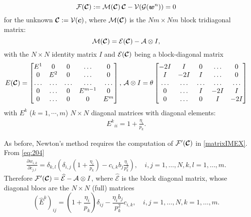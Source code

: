 \documentclass[preprint]{elsarticle}
\theoremstyle{definition}
\newcommand{\bw}{\boldsymbol w}
\newcommand{\bc}{\boldsymbol c}
\newcommand{\clC}{{\boc{C}}}
\def\boc#1{\boldsymbol{{\cal #1}}}
\begin{document}
 \begin{equation}\label{matrixIMEX} 
{\mathcal{F}(\clC):=\mathcal{M}}(\clC) \,  {\clC}-{\mathcal{V}(\mathcal{G}(\bw^{n}))}=0
\end{equation}
for the unknown $\clC:=\mathcal{V}(\bc)$, where    ${\cal
  M}(\clC)$ is the $N m \times N m$ 
block tridiagonal matrix: 
 \begin{equation} 
{\cal M} (\clC)= {\cal E}(\clC) - \mathcal{A}\otimes I,
\end{equation}
with the $N\times N$ identity matrix $I$ and ${\cal E}(\clC)$ being a block-diagonal matrix 
\[E(\clC)= \begin{bmatrix} E^1 & {0}&{0}&{\dots}&{0}\\ 
{0}&{E^2}&{0}&{\dots}&{0} \\ 
{\dots}&{\dots}&{\dots}&{\dots}&{\dots} \\ 
{0}&{\dots}&{0}&{E^{m-1}}&{0} \\ 
{0}&{\dots}&{0}&{0}&{E^m}  \\ 
\end{bmatrix}, \,
\mathcal{A}\otimes I=\theta\begin{bmatrix} 
{-2 I}&{ I}&{0}&{\dots}&{0}\\ 
{ I}&{-2 I}&{ I}&{\dots}&{0} \\ 
{\dots}&{\dots}&{\dots}&{\dots}&{\dots} \\ 
{0}&{\dots}&{ I}&{-2 I}&{ I} \\ 
{0}&{\dots}&{0}&{ I}&{-2 I}  \\ 
\end{bmatrix}\]
with  $E^k$ ($k=1,\cdots,m$)  $N\times N$ diagonal matrices with
diagonal elements: 
\begin{eqnarray*}{E^k}_{ii}=1+\frac{\eta_i}{p_k} .
\end{eqnarray*}




As before, Newton's method requires  the computation of 
  $\mathcal{F}'(\boc{C})$ in \eqref{matrixIMEX}. From \eqref{eq:204}
  \begin{align*}
    \frac{\partial w_{i,k}}{\partial c_{j,l}}=\delta_{k,l}
    \left(
      \delta _{i, j}
\left(1+\frac{\eta_i}{p_k}\right)
-
    c_{i, k} b_j
\frac{\eta_i}{p_k^2}\right),\quad i, j=1, \dots , N, k, l=1, \dots , m.
\end{align*}
Therefore
$\mathcal{F}'(\boc{C})=\widehat{\mathcal{E}}-\mathcal{A}\otimes I$,
where $\widehat{\mathcal{E}}$ is the block diagonal matrix, whose
diagonal blocs 
are the  $N\times N$ (full) matrices
\begin{equation*}
(\hat
E^k)_{ij}=\left(1+\frac{\eta_i}{p_k}\right)\delta_{ij}-\frac{\eta_i
  b_j}{p^2_k} c_{i, k}, \quad i, j=1, \dots , N, k=1,\dots,m.
\end{equation*}
\end{document}
